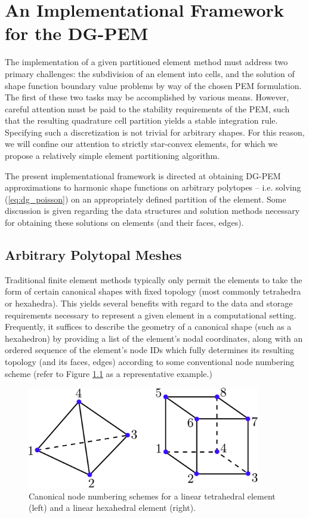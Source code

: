 \chapter{An Implementational Framework \\ for the DG-PEM} \label{ch:implementation}
%
The implementation of a given partitioned element method must address two primary challenges: the subdivision of an element into cells, and the solution of shape function boundary value problems by way of the chosen PEM formulation. The first of these two tasks may be accomplished by various means. However, careful attention must be paid to the stability requirements of the PEM, such that the resulting quadrature cell partition yields a stable integration rule. Specifying such a discretization is not trivial for arbitrary shapes. For this reason, we will confine our attention to strictly star-convex elements, for which we propose a relatively simple element partitioning algorithm.

The present implementational framework is directed at obtaining DG-PEM approximations to harmonic shape functions on arbitrary polytopes -- i.e. solving (\ref{eq:dg_poisson}) on an appropriately defined partition of the element. Some discussion is given regarding the data structures and solution methods necessary for obtaining these solutions on elements (and their faces, edges).

\section{Arbitrary Polytopal Meshes}

	Traditional finite element methods typically only permit the elements to take the form of certain canonical shapes with fixed topology (most commonly tetrahedra or hexahedra). This yields several benefits with regard to the data and storage requirements necessary to represent a given element in a computational setting. Frequently, it suffices to describe the geometry of a canonical shape (such as a hexahedron) by providing a list of the element's nodal coordinates, along with an ordered sequence of the element's node IDs which fully determines its resulting topology (and its faces, edges) according to some conventional node numbering scheme (refer to Figure \ref{fig:canonical_orderings} as a representative example.)
	\begin{figure} [!ht]
		\centering
		\includegraphics[width = 4.0in]{figures/canonical_orderings.pdf}
		\caption{Canonical node numbering schemes for a linear tetrahedral element (left) and a linear hexahedral element (right).}
		\label{fig:canonical_orderings}
	\end{figure}
	
